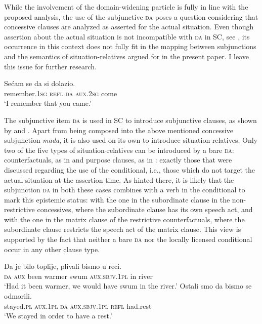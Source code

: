 \documentclass[output=paper,
colorlinks,
citecolor=brown,
newtxmath
]{langscibook}
\begin{document}
\noindent While the involvement of the domain-widening particle is fully in line with the proposed analysis, the use of the subjunctive \textsc{da} poses a question considering that concessive clauses are analyzed as asserted for the actual situation. Even though assertion about the actual situation is not incompatible with \textsc{da} in SC, see , its occurrence in this context does not fully fit in the mapping between subjunctions and the semantics of situation-relatives argued for in the present paper. I leave this issue for further research.

\ea\label{ex:Factive-da}
    \gll Sećam se da si dolazio.\\
    remember.\textsc{1sg} \textsc{refl} \textsc{da} \textsc{aux.2sg} come\\
    \glt `I remember that you came.'
\z

\noindent The subjunctive item \textsc{da} is used in SC to introduce subjunctive clauses, as shown by \cite{Topolinska1992} and \cite{Miseska-Tomic2004}. Apart from being composed into the above mentioned concessive subjunction \textit{mada}, it is also used on its own to introduce situation-relatives. Only two of the five types of situation-relatives can be introduced by a bare \textsc{da}: counterfactuals, as in  and purpose clauses, as in : exactly those that were discussed regarding the use of the conditional, i.e., those which do not target the actual situation at the assertion time. As hinted there, it is likely that the subjunction \textsc{da} in both these cases combines with a verb in the conditional to mark this epistemic status: with the one in the subordinate clause in the non-restrictive concessives, where the subordinate clause has its own speech act, and with the one in the matrix clause of the restrictive counterfactuals, where the subordinate clause restricts the speech act of the matrix clause. This view is supported by the fact that neither a bare \textsc{da} nor the locally licensed conditional occur in any other clause type.

\ea\label{ex:Da-clauses1}
    \ea \gll Da je bilo toplije, plivali bismo u reci.\\
    \textsc{da} \textsc{aux} been warmer swum \textsc{aux.sbjv.1pl} in river\\
    \glt `Had it been warmer, we would have swum in the river.'\label{ex:Da-clauses-a}
	\ex \gll Ostali smo da bismo se odmorili.\\
    stayed.\textsc{pl} \textsc{aux.1pl} \textsc{da} \textsc{aux.sbjv.1pl} \textsc{refl} had.rest\\
\glt `We stayed in order to have a rest.'\label{ex:Da-clauses-b}
\z\z
\end{document}
